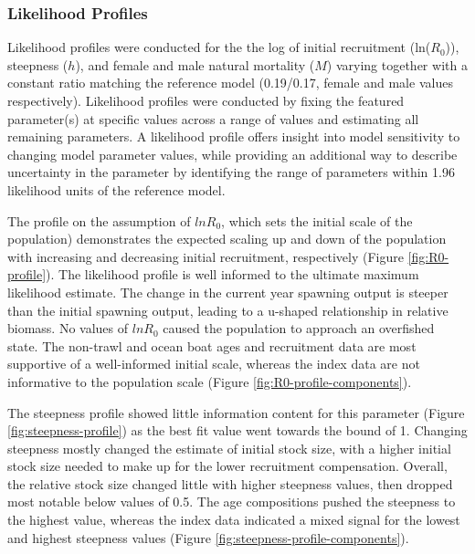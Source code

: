 \documentclass[11pt,
  english,
  letterpaper,
]{article}
\begin{document}
\hypertarget{likelihood-profiles-1}{%
\subsubsection{Likelihood Profiles}\label{likelihood-profiles-1}}

Likelihood profiles were conducted for the the log of initial recruitment (ln(\(R_0\))), steepness (\(h\)), and female and male natural mortality (\(M\)) varying together with a constant ratio matching the reference model (0.19/0.17, female and male values respectively). Likelihood profiles were conducted by fixing the featured parameter(s) at specific values across a range of values and estimating all remaining parameters. A likelihood profile offers insight into model sensitivity to changing model parameter values, while providing an additional way to describe uncertainty in the parameter by identifying the range of parameters within 1.96 likelihood units of the reference model.

The profile on the assumption of \(lnR_0\), which sets the initial scale of the population) demonstrates the expected scaling up and down of the population with increasing and decreasing initial recruitment, respectively (Figure \ref{fig:R0-profile}). The likelihood profile is well informed to the ultimate maximum likelihood estimate. The change in the current year spawning output is steeper than the initial spawning output, leading to a u-shaped relationship in relative biomass. No values of \(lnR_0\) caused the population to approach an overfished state. The non-trawl and ocean boat ages and recruitment data are most supportive of a well-informed initial scale, whereas the index data are not informative to the population scale (Figure \ref{fig:R0-profile-components}).

The steepness profile showed little information content for this parameter (Figure \ref{fig:steepness-profile}) as the best fit value went towards the bound of 1. Changing steepness mostly changed the estimate of initial stock size, with a higher initial stock size needed to make up for the lower recruitment compensation. Overall, the relative stock size changed little with higher steepness values, then dropped most notable below values of 0.5. The age compositions pushed the steepness to the highest value, whereas the index data indicated a mixed signal for the lowest and highest steepness values (Figure \ref{fig:steepness-profile-components}).
\end{document}
